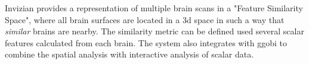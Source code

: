 Invizian \autocite{bowman_query-based_2011, bowman_visual_2012, van_horn_graphical_2013} provides a representation of multiple brain scans in a "Feature Similarity Space", where all brain surfaces are located in a 3d space in such a way that \emph{similar} brains are nearby. The similarity metric can be defined used several scalar features calculated from each brain. The system also integrates with ggobi to combine the spatial analysis with interactive analysis of scalar data.

\begin{table}
	\centering
		\begin{tabular}
			
		\end{tabular}
	\label{tab_related_brain_applications}
\end{table}